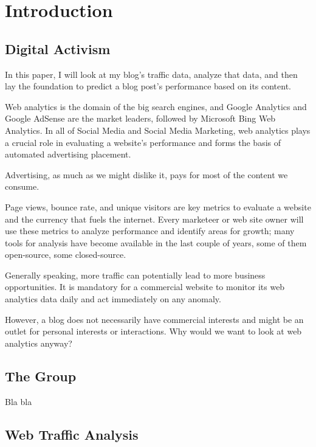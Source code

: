 %
%

\pagebreak
\section{Introduction}

\onehalfspacing

\subsection{Digital Activism}

In this paper, I will look at my blog's traffic data, analyze that data, and then lay the foundation to predict a blog post's performance based on its content.

Web analytics is the domain of the big search engines, and Google Analytics and Google AdSense are the market leaders, followed by Microsoft Bing Web Analytics. In all of Social Media and Social Media Marketing, web analytics plays a crucial role in evaluating a website's performance and forms the basis of automated advertising placement.

Advertising, as much as we might dislike it, pays for most of the content we consume.

Page views, bounce rate, and unique visitors are key metrics to evaluate a website and the currency that fuels the internet. Every marketeer or web site owner will use these metrics to analyze performance and identify areas for growth; many tools for analysis have become available in the last couple of years, some of them open-source, some closed-source.

Generally speaking, more traffic can potentially lead to more business opportunities. It is mandatory for a commercial website to monitor its web analytics data daily and act immediately on any anomaly.

However, a blog does not necessarily have commercial interests and might be an outlet for personal interests or interactions. Why would we want to look at web analytics anyway?

\subsection{The Group}

Bla bla

\subsection{Web Traffic Analysis}

